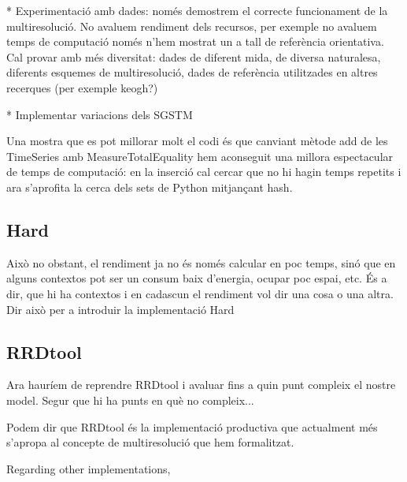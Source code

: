 

* Experimentació amb dades: només demostrem el correcte funcionament de la multiresolució. No avaluem rendiment dels recursos, per exemple no avaluem temps de computació només n'hem mostrat un a tall de referència orientativa.  Cal provar amb més diversitat: dades de diferent mida, de diversa naturalesa, diferents esquemes de multiresolució, dades de referència utilitzades en altres recerques (per exemple keogh?)





* Implementar variacions dels \gls{SGSTM}


  Una mostra que es pot millorar molt
el codi és que canviant mètode add de les TimeSeries amb
MeasureTotalEquality hem aconseguit una millora espectacular de temps
de computació: en la inserció cal cercar que no hi hagin temps
repetits i ara s'aprofita la cerca dels sets de Python mitjançant
hash.









\subsection{Hard}




Això no obstant, el rendiment ja no és només calcular en poc temps, sinó que en alguns contextos pot ser un consum baix d'energia, ocupar poc espai, etc.
És a dir, que hi ha contextos i en cadascun el rendiment vol dir una cosa o una altra. Dir això per a introduir la implementació Hard







\subsection{RRDtool}



Ara hauríem de reprendre RRDtool i avaluar fins a quin punt compleix el nostre model. 
Segur que hi ha punts en què no compleix... 

Podem dir que RRDtool és la implementació productiva que actualment més s'apropa al concepte de multiresolució que hem formalitzat.


Regarding other implementations,






